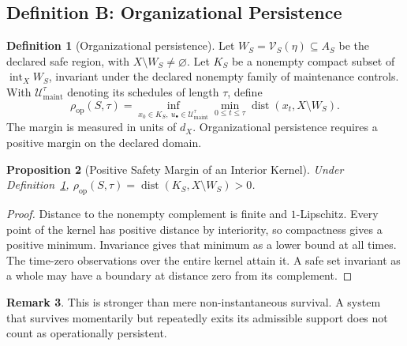 \documentclass[11pt,a4paper]{article}
\newtheorem{proposition}{Proposition}[section]
\theoremstyle{definition}
\newtheorem{definition}[proposition]{Definition}
\newtheorem{remark}[proposition]{Remark}
\newcommand{\Aset}{A_S}
\newcommand{\Vset}{\mathcal{V}_S}
\newcommand{\Persist}{\rho_{\mathrm{op}}}
\newcommand{\dist}{\operatorname{dist}}
\begin{document}
\subsection{Definition B: Organizational Persistence}
\begin{definition}[Organizational persistence]\label{def:organizational-persistence}
Let $W_S=\Vset(\eta)\subseteq\Aset$ be the declared safe region, with $X\setminus W_S\ne\varnothing$. Let $K_S$ be a nonempty compact subset of $\operatorname{int}_X W_S$, invariant under the declared nonempty family of maintenance controls. With $\mathcal U_{\mathrm{maint}}^\tau$ denoting its schedules of length $\tau$, define
\[
\Persist(S,\tau)=
\inf_{x_0\in K_S,\ u_\bullet\in\mathcal U_{\mathrm{maint}}^\tau}
\min_{0\le t\le\tau}\dist(x_t,X\setminus W_S).
\]
The margin is measured in units of $d_X$. Organizational persistence requires a positive margin on the declared domain.
\end{definition}

\begin{proposition}[Positive Safety Margin of an Interior Kernel]\label{prop:interior-kernel-margin}
Under Definition~\ref{def:organizational-persistence}, $\Persist(S,\tau)=\dist(K_S,X\setminus W_S)>0$.
\end{proposition}
\begin{proof}
Distance to the nonempty complement is finite and $1$-Lipschitz. Every point of the kernel has positive distance by interiority, so compactness gives a positive minimum. Invariance gives that minimum as a lower bound at all times. The time-zero observations over the entire kernel attain it. A safe set invariant as a whole may have a boundary at distance zero from its complement.
\end{proof}

\begin{remark}
This is stronger than mere non-instantaneous survival. A system that survives momentarily but repeatedly exits its admissible support does not count as operationally persistent.
\end{remark}
\end{document}
